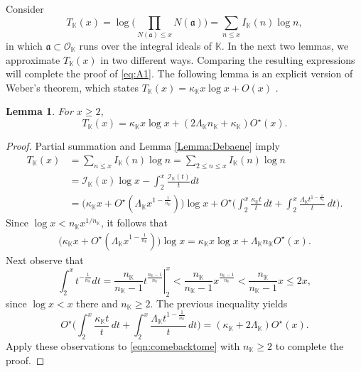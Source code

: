 \documentclass[10pt,reqno]{amsart}
\theoremstyle{plain}
\newtheorem{lemma}[theorem]{Lemma}
\theoremstyle{definition}
\newcommand{\K}{\mathbb{K}}
\renewcommand{\O}{\mathcal{O}}
\newcommand{\I}{\mathcal{I}}
\begin{document}
Consider
\begin{equation*}
T_{\K}(x) = \log\bigg(\prod_{N(\mathfrak{a})\leq x}N(\mathfrak{a})\bigg) = \sum_{n\leq x} I_{\K}(n)\log{n},
\end{equation*}
in which $\mathfrak{a}\subset\O_{\K}$ runs over the integral ideals of $\K$.
In the next two lemmas, we approximate $T_{\K}(x)$ in two different ways.  Comparing the resulting expressions will complete the proof of \eqref{eq:A1}. 
The following lemma is an explicit version of Weber's theorem, which states $T_{\K}(x) = \kappa_{\K} x \log x + O(x)$ \cite[p.~128]{DiamondHalberstam}.

\begin{lemma}\label{Lemma:FirstBound}
For $x \geq 2$,
\begin{equation*}
T_{\K}(x) =  \kappa_{\K} x\log x + (2\Lambda_{\K} n_{\K} +\kappa_{\K})O^{\star}(x).
\end{equation*}
\end{lemma}

\begin{proof}
Partial summation and Lemma \ref{Lemma:Debaene} imply 
\begin{align}
T_{\K}(x)
&= \sum_{n\leq x}I_{\K}(n)\log{n} = \sum_{2\leq n\leq x}I_{\K}(n)\log{n}\nonumber\\
&= \I_{\K}(x)\log{x} - \int_{2}^{x}\frac{\I_{\K}(t)}{t}dt\nonumber\\
&= \big(\kappa_{\K} x + O^{\star}(\Lambda_{\K}x^{1-\frac{1}{n_{\K}}})\big) \log{x} 
+O^{\star}\bigg( \int_{2}^{x}\frac{\kappa_{\K} t}{t}\,dt + \int_{2}^{x}\frac{\Lambda_{\K}t^{1-\frac{1}{n_{\K}}}}{t}\,dt \bigg).\label{eqn:comebacktome}
\end{align}
Since $\log{x} < n_{\K} x^{1/n_{\K}}$, it follows that
\begin{align*}
    \big(\kappa_{\K} x + O^{\star}(\Lambda_{\K}x^{1-\frac{1}{n_{\K}}})\big) \log{x}
    = \kappa_{\K} x \log{x} + \Lambda_{\K} n_{\K}O^{\star}(x).
\end{align*}
Next observe that
\begin{equation*}
    \int_2^x t^{-\frac{1}{n_{\K}}}dt
     =\left.\frac{n_{\K}}{n_{\K} - 1}t^{\frac{n_{\K}-1}{n_{\K}}}\right|_{2}^{x} 
     < \frac{n_{\K}}{n_{\K} - 1}x^{\frac{n_{\K}-1}{n_{\K}}} 
     < \frac{n_{\K}}{n_{\K} - 1}x \leq 2x,
\end{equation*}
since $\log x < x$ there and $n_{\K} \geq 2$.
The previous inequality yields
\begin{equation*}
    O^{\star}\bigg(  \int_{2}^{x}\frac{\kappa_{\K} t}{t}\,dt +\int_{2}^{x}\frac{\Lambda_{\K}t^{1-\frac{1}{n_{\K}}}}{t}\,dt \bigg)
    = \left(\kappa_{\K} + 2 \Lambda_{\K} \right)O^{\star}(x).
\end{equation*}
Apply these observations to \eqref{eqn:comebacktome} with $n_{\K} \geq 2$
to complete the proof.
\end{proof}
\end{document}
